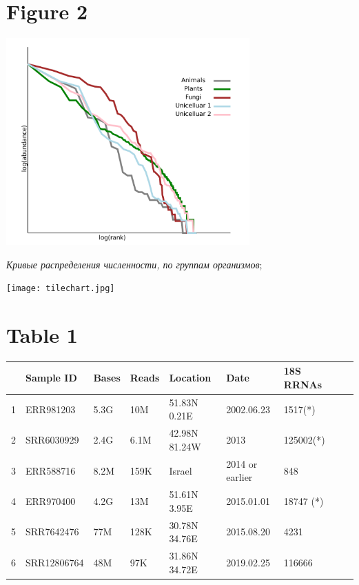 \documentclass[a4paper]{article}
\begin{document}

\newpage
\section*{Figure 2} 

\includegraphics[width=0.7\textwidth]{rankabundance.jpg}

\textit{Кривые распределения численности, по группам организмов}; 

\vskip 10pt
\texttt{[image: tilechart.jpg]}

\vskip 15pt

\newpage
\section*{Table 1} 

\begin{tabular}{lllllllll}
\hline
&Sample ID&Bases&Reads&Location&Date&18S RRNAs\\
\hline
1&ERR981203&5.3G&10M&51.83N 0.21E&2002.06.23&1517(*)\\
2&SRR6030929&2.4G&6.1M&42.98N 81.24W&2013&125002(*)\\
3&ERR588716&8.2M&159K&Israel&2014 or earlier&848\\
4&ERR970400&4.2G&13M&51.61N 3.95E&2015.01.01&18747 (*)\\
5&SRR7642476&77M&128K&30.78N 34.76E&2015.08.20&4231\\
6&SRR12806764&48M&97K&31.86N 34.72E&2019.02.25&116666\\
\hline
\end{tabular}
\end{document}
